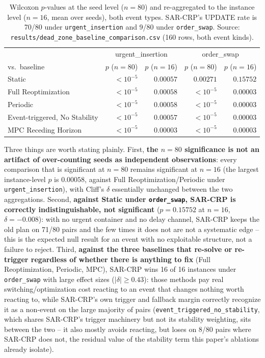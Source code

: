 \documentclass[11pt]{article}
\begin{document}
\begin{table}[h]
\centering
\small
\begin{tabular}{lrrrr}
\hline
 & \multicolumn{2}{c}{urgent\_insertion} & \multicolumn{2}{c}{order\_swap} \\
vs.\ baseline & $p$ ($n{=}80$) & $p$ ($n{=}16$) & $p$ ($n{=}80$) & $p$ ($n{=}16$) \\
\hline
Static                         & $<10^{-5}$ & $0.00057$ & $0.00271$ & $0.15752$ \\
Full Reoptimization            & $<10^{-5}$ & $0.00058$ & $<10^{-5}$ & $0.00003$ \\
Periodic                       & $<10^{-5}$ & $0.00058$ & $<10^{-5}$ & $0.00003$ \\
Event-triggered, No Stability  & $<10^{-5}$ & $0.00057$ & $<10^{-5}$ & $0.00003$ \\
MPC Receding Horizon           & $<10^{-5}$ & $0.00003$ & $<10^{-5}$ & $0.00003$ \\
\hline
\end{tabular}
\caption{Wilcoxon $p$-values at the seed level ($n=80$) and re-aggregated
to the instance level ($n=16$, mean over seeds), both event types. SAR-CRP's
UPDATE rate is 70/80 under \texttt{urgent\_insertion} and 9/80 under
\texttt{order\_swap}. Source:
\texttt{results/dead\_zone\_baseline\_comparison.csv} (160 rows, both event
kinds).}
\label{tab:dead-zone-order-swap}
\end{table}

Three things are worth stating plainly. First, \textbf{the $n=80$
significance is not an artifact of over-counting seeds as independent
observations}: every comparison that is significant at $n=80$ remains
significant at $n=16$ (the largest instance-level $p$ is $0.00058$,
against Full Reoptimization/Periodic under \texttt{urgent\_insertion}),
with Cliff's $\delta$ essentially unchanged between the two aggregations.
Second, \textbf{against Static under \texttt{order\_swap}, SAR-CRP is
correctly indistinguishable, not significant} ($p=0.15752$ at $n=16$,
$\delta=-0.008$): with no urgent container and no delay channel, SAR-CRP
keeps the old plan on 71/80 pairs and the few times it does not are not a
systematic edge -- this is the expected null result for an event with no
exploitable structure, not a failure to reject. Third, \textbf{against the
three baselines that re-solve or re-trigger regardless of whether there is
anything to fix} (Full Reoptimization, Periodic, MPC), SAR-CRP wins
16 of 16 instances under \texttt{order\_swap} with large effect sizes
($|\delta| \geq 0.43$): those methods pay real switching/optimization cost
reacting to an event that changes nothing worth reacting to, while SAR-CRP's
own trigger and fallback margin correctly recognize it as a non-event on
the large majority of pairs (\texttt{event\_triggered\_no\_stability}, which
shares SAR-CRP's trigger machinery but not its stability weighting, sits
between the two -- it also mostly avoids reacting, but loses on 8/80 pairs
where SAR-CRP does not, the residual value of the stability term this
paper's ablations already isolate).
\end{document}
